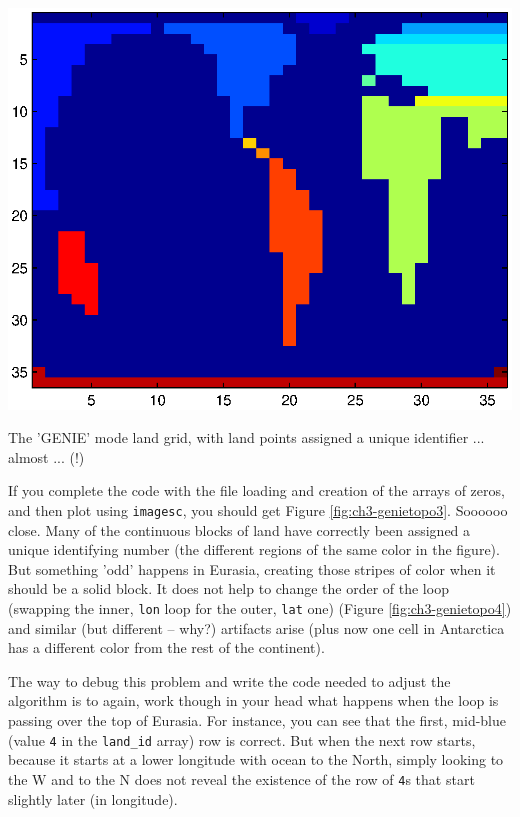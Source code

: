 \documentclass{tufte-book} %
\begin{document}
\begin{marginfigure}[0.0in]
\includegraphics[width=\linewidth]{ch3-genietopo3.eps}
\caption{The 'GENIE' mode land grid, with land points assigned a unique identifier ... almost ... (!)}
\label{fig:ch3-genietopo3}
\end{marginfigure}

If you complete the code with the file loading and creation of the arrays of zeros, and then plot using \texttt{imagesc}, you should get Figure \ref{fig:ch3-genietopo3}.
Soooooo close. Many of the continuous blocks of land have correctly been assigned a unique identifying number (the different regions of the same color in the figure). But something 'odd' happens in Eurasia, creating those stripes of color when it should be a solid block. It does not help to change the order of the loop (swapping the inner, \texttt{lon} loop for the outer, \texttt{lat} one) (Figure \ref{fig:ch3-genietopo4}) and similar (but different -- why?) artifacts arise (plus now one cell in Antarctica has a different color from the rest of the continent).

The way to debug this problem and write the code needed to adjust the algorithm is to again, work though in your head what happens when the loop is passing over the top of Eurasia. For instance, you can see that the first, mid-blue (value \texttt{4} in the \texttt{land\_id} array) row is correct. But when the next row starts, because it starts at a  lower longitude with ocean to the North, simply looking to the W and to the N does not reveal the existence of the row of \texttt{4}s that start slightly later (in longitude).
\end{document}

